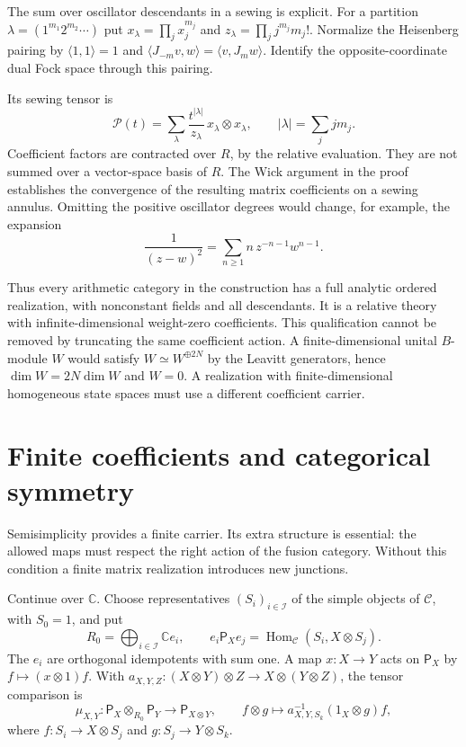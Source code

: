 The sum over oscillator descendants in a sewing is explicit. For a
partition $\lambda=(1^{m_1}2^{m_2}\cdots)$ put
$x_\lambda=\prod_jx_j^{m_j}$ and
$z_\lambda=\prod_jj^{m_j}m_j!$. Normalize the Heisenberg pairing by
$\langle1,1\rangle=1$ and
$\langle J_{-m}v,w\rangle=\langle v,J_mw\rangle$.
Identify the opposite-coordinate dual Fock space through this pairing.

Its sewing tensor is
\begin{equation}\label{v4-arith:asi:oscillator-sewing}
 \mathcal P(t)=\sum_\lambda
       \frac{t^{|\lambda|}}{z_\lambda}\,x_\lambda\otimes x_\lambda,
 \qquad |\lambda|=\sum_jjm_j.
\end{equation}
Coefficient factors are contracted over $R$, by the relative evaluation.
They are not summed over a vector-space basis of $R$. The Wick argument
in the proof establishes the convergence of the resulting matrix
coefficients on a sewing annulus. Omitting the positive oscillator
degrees would change, for example, the expansion
\[
 \frac1{(z-w)^2}=\sum_{n\geq1}n\,z^{-n-1}w^{n-1}.
\]

Thus every arithmetic category in the construction has a full analytic
ordered realization, with nonconstant fields and all descendants.
It is a relative theory with infinite-dimensional weight-zero
coefficients. This qualification cannot be removed by truncating the
same coefficient action. A finite-dimensional unital $B$-module $W$
would satisfy $W\simeq W^{\oplus2N}$ by the Leavitt generators, hence
$\dim W=2N\dim W$ and $W=0$. A realization with finite-dimensional
homogeneous state spaces must use a different coefficient carrier.

\section{Finite coefficients and categorical symmetry}
\label{v4-arith:asi:sec:finite-coefficients}

Semisimplicity provides a finite carrier. Its extra structure is essential:
the allowed maps must respect the right action of the fusion category.
Without this condition a finite matrix realization introduces new junctions.

Continue over $\mathbb C$. Choose representatives $(S_i)_{i\in\mathcal I}$ of
the simple objects of $\mathcal C$, with $S_0=1$, and put
\[
 R_0=\bigoplus_{i\in\mathcal I}\mathbb C e_i,\qquad
 e_i\mathsf P_Xe_j=\operatorname{Hom}_{\mathcal C}(S_i,X\otimes S_j).
\]
The $e_i$ are orthogonal idempotents with sum one. A map $x:X\to Y$
acts on $\mathsf P_X$ by $f\mapsto(x\otimes1)f$. With
$a_{X,Y,Z}:(X\otimes Y)\otimes Z\to X\otimes(Y\otimes Z)$,
the tensor comparison is
\begin{equation}\label{v4-arith:asi:finite-tensorator}
 \mu_{X,Y}:\mathsf P_X\otimes_{R_0}\mathsf P_Y\longrightarrow
 \mathsf P_{X\otimes Y},\qquad
 f\otimes g\longmapsto a_{X,Y,S_k}^{-1}(1_X\otimes g)f,
\end{equation}
where $f:S_i\to X\otimes S_j$ and $g:S_j\to Y\otimes S_k$.

